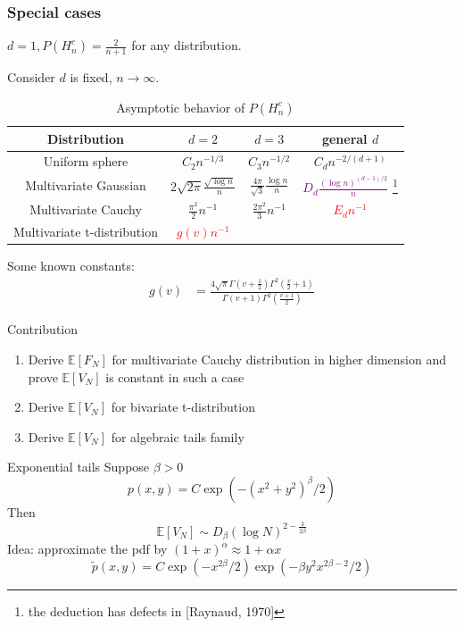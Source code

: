 \documentclass{beamer}
\def\E{\mathbb{E}}
\begin{document}
\begin{frame}
    \frametitle{Special cases}
    $d=1,P(H_n^c) = \frac{2}{n+1}$ for any distribution.
    
    Consider $d$ is fixed, $n\to \infty$.
    \begin{table}
        \begin{tabular}{|c|c|c|c|}
            \hline
            Distribution & $d=2$ & $d=3$ &  general $d$ \\
            \hline
            Uniform sphere & $C_2 n^{-1/3}$ & $C_3 n^{-1/2}$ &
            $C_{d} n^{-2/(d+1)}$ \\
            \hline
            Multivariate Gaussian &
            $2\sqrt{2\pi}\frac{\sqrt{\log n}}{n}$
            & $\frac{4\pi}{\sqrt{3}}\frac{\log n}{n}$
            & 
            \textcolor{purple}
            {$D_d\frac{(\log n)^{(d-1)/2}}{n}$}
            \footnote{the deduction has defects
            in [Raynaud, 1970]} \\
            \hline
            Multivariate Cauchy & 
            $\frac{\pi^2}{2}n^{-1}$ &
            $\frac{2\pi^2}{3}n^{-1}$ &
            \textcolor{red}{$E_d n^{-1}$}\\
            \hline
            Multivariate t-distribution &
            \textcolor{red}{$g(v) n^{-1}$} & & \\
            \hline
        \end{tabular}
        \caption{Asymptotic behavior of $P(H_n^c)$}
    \end{table}
    Some known constants:
    \begin{align*}
    g(v) &= \frac{4\sqrt{\pi}
    \Gamma(v+\frac{1}{2})\Gamma^2\left(\frac{v}{2}+1\right)}
    {\Gamma(v+1)\Gamma^2 \left(\frac{v+1}{2} \right)}
    \end{align*}
\end{frame}
\begin{frame}{Contribution}
    \begin{enumerate}
        \item Derive $\E[F_N]$ for multivariate Cauchy distribution in higher dimension
        and prove $\E[V_N]$ is constant in such a case
        \item Derive $\E[V_N]$ for bivariate t-distribution
        \item Derive $\E[V_N]$ for algebraic tails family
    \end{enumerate}
\end{frame}
\begin{frame}{Exponential tails}
    Suppose $\beta > 0$
\begin{equation*}
    p(x,y) = C  \exp(-(x^2+y^2)^{\beta}/2)    
\end{equation*}
Then 
\begin{equation*}
    \E[V_N] \sim D_{\beta} (\log N)^{2-\frac{3}{2\beta}}
\end{equation*}
Idea: approximate the pdf by
$(1+x)^{\alpha} \approx 1+\alpha x$
\begin{equation*}
    \tilde{p}(x,y)=
    C \exp(-x^{2\beta}/2) \exp(-\beta y^2 x^{2\beta-2}/2)
\end{equation*}
\end{frame}
\end{document}
